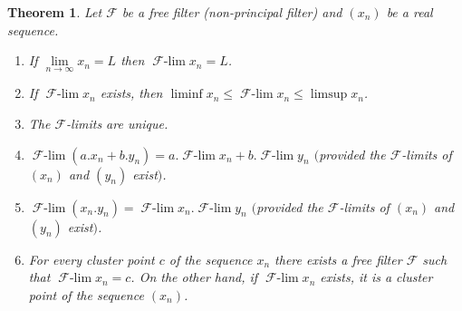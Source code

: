 \documentclass[12pt]{article}
\newcommand{\limti}[1]{\lim\limits_{#1\to\infty}}
\newcommand{\mc}{\mathcal}
\newtheorem{THM}{Theorem}
\newcommand{\F}{\mc F}
\newcommand{\Flim}{\operatorname{\F\text{-}\lim}}
\begin{document}
\begin{THM}
Let $\F$ be a free filter (non-principal filter) and $(x_n)$ be a real sequence.
\begin{enumerate}
\renewcommand{\theenumi}{\roman{enumi}}
\renewcommand{\labelenumi}{(\theenumi)}
  \item If $\limti n x_n=L$ then $\Flim x_n=L$.
  \item If $\Flim x_n$ exists, then $\liminf x_n \leq \Flim x_n \leq \limsup x_n$.
  \item The $\F$-limits are unique.
  \item $\Flim (a.x_n+b.y_n)=a.\Flim x_n+b.\Flim y_n$ $($provided the $\F$-limits of $(x_n)$ and $(y_n)$ exist$)$.
  \item $\Flim (x_n.y_n)=\Flim x_n . \Flim y_n$ $($provided the $\F$-limits of $(x_n)$ and $(y_n)$ exist$)$.
  \item For every cluster point $c$ of the sequence $x_n$ there exists
    a free filter $\F$ such that $\Flim x_n=c$. On the other hand, if $\Flim
    x_n$ exists, it is a cluster point of the sequence $(x_n)$.
\end{enumerate}
\end{THM}
\end{document}
